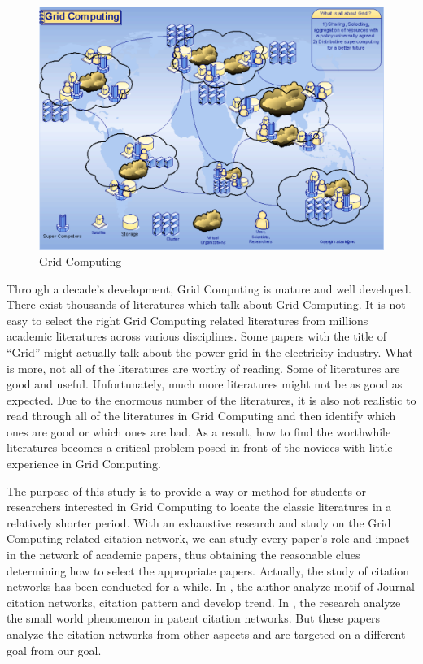 \begin{figure}[ht!]
\includegraphics [totalheight=0.25\textheight]{images/gridcomp}
\caption {Grid Computing}
\label {F:grid}
\end{figure}


Through a decade's development, Grid Computing is mature and well developed. There exist thousands of literatures which talk about Grid Computing. It is not easy to select the right Grid Computing related literatures from millions academic literatures across various disciplines. Some papers with the title of ``Grid'' might actually talk about the power grid in the electricity industry. What is more, not all of the literatures are worthy of reading. Some of literatures are good and useful. Unfortunately, much more literatures might not be as good as expected.  Due to the enormous number of the literatures, it is also not realistic to read through all of the literatures in Grid Computing and then identify which ones are good or which ones are bad.  As a result, how to find the worthwhile literatures becomes a critical problem posed in front of the novices with little experience in Grid Computing.

The purpose of this study is to provide a way or method for students or researchers interested in Grid Computing to locate the classic literatures in a relatively shorter period. With an exhaustive research and study on the Grid Computing related citation network,  we can study every paper's role and impact in the network of academic papers, thus obtaining the reasonable clues determining how to select the appropriate papers. Actually, the study of citation networks has been conducted for a while. In \cite{wu2008topology}, the author analyze motif of Journal citation networks, citation pattern and develop trend. In \cite{hung2008small}, the research analyze the small world phenomenon in patent citation networks. But these papers analyze the citation networks from other aspects and are targeted on a different goal from our goal.

